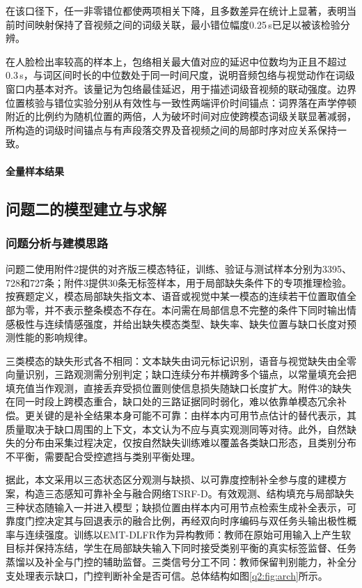 在该口径下，任一非零错位都使两项相关下降，且多数差异在统计上显著，表明当前时间映射保持了音视频之间的词级关联，最小错位幅度0.25\,s已足以被该检验分辨。

在人脸检出率较高的样本上，包络相关最大值对应的延迟中位数均为正且不超过0.3\,s，与词区间时长的中位数处于同一时间尺度，说明音频包络与视觉动作在词级窗口内基本对齐。该量记为包络最佳延迟，用于描述词级音视频的联动强度。边界位置核验与错位实验分别从有效性与一致性两端评价时间锚点：词界落在声学停顿附近的比例约为随机位置的两倍，人为破坏时间对应使跨模态词级关联显著减弱，所构造的词级时间锚点与有声段落交界及音视频之间的局部时序对应关系保持一致。

\paragraph{全量样本结果}


\FloatBarrier


\subsection{问题二的模型建立与求解}
\label{sec:q2}

\subsubsection{问题分析与建模思路}
问题二使用附件2提供的对齐版三模态特征，训练、验证与测试样本分别为3395、728和727条；附件3提供30条无标签样本，用于局部缺失条件下的专项推理检验。按赛题定义，模态局部缺失指文本、语音或视觉中某一模态的连续若干位置取值全部为零，并不表示整条模态不存在。本问需在局部信息不完整的条件下同时输出情感极性与连续情感强度，并给出缺失模态类型、缺失率、缺失位置与缺口长度对预测性能的影响规律。

三类模态的缺失形式各不相同：文本缺失由词元标记识别，语音与视觉缺失由全零向量识别，三路观测需分别判定；缺口连续分布并横跨多个锚点，以常量填充会把填充值当作观测，直接丢弃受损位置则使信息损失随缺口长度扩大。附件3的缺失在同一时段上跨模态重合，缺口处的三路证据同时弱化，难以依靠单模态冗余补偿。更关键的是补全结果本身可能不可靠：由样本内可用节点估计的替代表示，其质量取决于缺口周围的上下文，本文认为不应与真实观测同等对待。此外，自然缺失的分布由采集过程决定，仅按自然缺失训练难以覆盖各类缺口形态，且类别分布不平衡，需要配合受控遮挡与类别平衡处理。

据此，本文采用以三态状态区分观测与缺损、以可靠度控制补全参与度的建模方案，构造三态感知可靠补全与融合网络TSRF-D。有效观测、结构填充与局部缺失三种状态随输入一并进入模型；缺损位置由样本内可用节点检索生成补全表示，可靠度门控决定其与回退表示的融合比例，再经双向时序编码与双任务头输出极性概率与连续强度。训练以EMT-DLFR\cite{ref:emt}作为异构教师：教师在原始可用输入上产生软目标并保持冻结，学生在局部缺失输入下同时接受类别平衡的真实标签监督、任务蒸馏以及补全与门控的辅助监督。三类信号分工不同：教师保留判别能力，补全分支处理表示缺口，门控判断补全是否可信。总体结构如图\ref{q2:fig:arch}所示。

